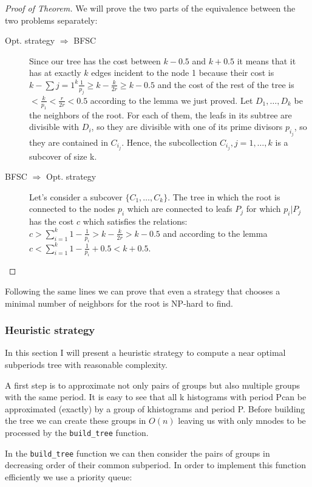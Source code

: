 \begin{proof}[Proof of Theorem]
We will prove the two parts of the equivalence between the two problems separately:
\begin{description}
\item[Opt. strategy $\Rightarrow$ BFSC] 
Since our tree has the cost between $k-0.5$ and $k+0.5$ it means that it has at exactly $k$ edges incident to the node 1 because their cost is $k-\sum{j=1}^k \frac 1 {p_j} \geq k-\frac k {2r} \geq k-0.5$ and the cost of the rest of the tree is $ <\frac k {p_1}< \frac r{2r}<0.5$ according to the lemma we just proved. Let $D_1, \ldots, D_k$ be the neighbors of the root. For each of them, the leafs in its subtree are divisible with $D_i$, so they are divisible with one of its prime divisors $p_{i_j}$, so they are contained in $C_{i_j}$. Hence, the subcollection $C_{i_j},j=1,\ldots,k$ is a subcover of size k.

\item[BFSC $\Rightarrow$ Opt. strategy] Let’s consider a subcover $\{C_1,\ldots,C_k\}$. The tree in which the root is connected to the nodes $p_i$ which are connected to leafs $P_j$ for which $p_i \vert P_j$ has the cost $c$ which satisfies the relations: $c > \sum_{i=1}^k 1-\frac 1{p_i} > k-\frac k{2r}>k-0.5$ and according to the lemma $c<\sum_{i=1}^k 1-\frac 1{p_i}+0.5<k+0.5$.
\end{description}\end{proof}
 
Following the same lines we can prove that even a strategy that chooses a minimal number of neighbors for the root is NP-hard to find.

\subsubsection*{Heuristic strategy}

In this section I will present a heuristic strategy to compute a near optimal subperiods tree with reasonable complexity. 

A first step is to approximate not only pairs of groups but also multiple groups with the same period. It is easy to see that all k histograms with period Pcan be approximated (exactly) by a group of khistograms and period P. Before building the tree we can create these groups in $O(n)$ leaving us with only mnodes to be processed by the \verb+build_tree+ function. 

In the \verb+build_tree+ function we can then consider the pairs of groups in decreasing order of their common subperiod. In order to implement this function efficiently we use a priority queue:

